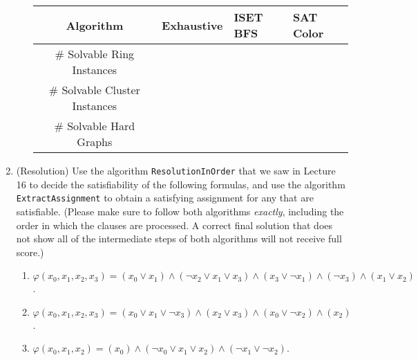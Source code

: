 \documentclass[11pt]{article}
\begin{document}
\begin{enumerate}
\begin{enumerate}
\begin{center}
    \begin{tabular}{|c|l|l|l|}
    \hline 
    Algorithm
    & \multicolumn{1}{|p{2cm}|}{Exhaustive}
    & \multicolumn{1}{|p{2cm}|}{ISET BFS}
    & \multicolumn{1}{|p{2cm}|}{SAT Color}\\\hline
    \hline
        \# Solvable Ring Instances &  &  & \\
        \# Solvable Cluster Instances  &   & &  \\
        \# Solvable Hard Graphs  &   & &  \\
        \hline
    \end{tabular}
\end{center}

  \end{enumerate}


\item (Resolution) Use the algorithm \texttt{ResolutionInOrder} that we saw in Lecture 16 to decide the satisfiability of the following formulas, and use the algorithm \texttt{ExtractAssignment} to obtain a satisfying assignment for any that are satisfiable. (Please make sure to follow both algorithms \textit{exactly}, including the order in which the clauses are processed. A correct final solution that does not show all of the intermediate steps of both algorithms will not receive full score.)
  
  \begin{enumerate}
      \item $\varphi(x_0, x_1, x_2, x_3) = (x_0 \vee x_1) \wedge (\neg x_2 \vee  x_1\vee x_3) \wedge (x_3 \vee \neg x_1) \wedge (\neg x_3) \wedge ( x_1 \vee  x_2)$.

    \item $\varphi(x_0, x_1, x_2, x_3) = (x_0 \vee x_1 \vee \neg x_3) \wedge (x_2 \vee x_3) \wedge (x_0 \vee \neg x_2) \wedge (x_2)$.

    \item $\varphi(x_0, x_1, x_2) = (x_0) \wedge (\neg x_0 \vee x_1 \vee x_2) \wedge (\neg x_1 \vee \neg x_2)$.

  \end{enumerate}


\end{enumerate}
\end{document}
